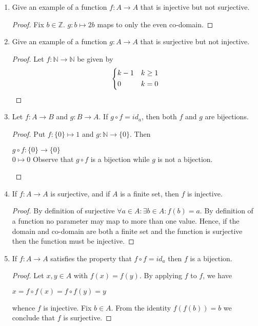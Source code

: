 \documentclass{article}
\begin{document}
\begin{enumerate}
\begin{proof}
    \end{proof}
  \item Give an example of a function $f : A\to A$ that is injective but not surjective.
    \begin{proof}
      Fix $b\in \mathbb{Z}$. $g : b\mapsto 2b$ maps to only the even co-domain.
    \end{proof}
  \item Give an example of a function $g : A\to A$ that is surjective but not injective. 
    \begin{proof}
      Let $f: \mathbb{N} \to \mathbb{N}$ be given by
        $$
        \begin{dcases}
          k-1 & k \geq 1 \\
          0 & k = 0
        \end{dcases}
       $$
     \end{proof}
  \item Let $f : A\to B$ and $g : B\to A$. If $g \circ f = id_{a}$, then both $f$ and $g$ are bijections.
   \begin{proof}
     Put $f : \{0\} \mapsto 1$ and $g: \mathbb{N} \to  \{0\}$. Then
       \begin{center}
         $g \circ f: \{0\} \to \{0\}$ \\
         $0 \mapsto 0$
         Observe that $g \circ f$ is a bijection while $g$ is not a bijection.
       \end{center}
   \end{proof}
  \item If $f : A\to A$ is surjective, and if $A$ is a finite set, then $f$ is injective.
    \begin{proof}
By definition of surjective $\forall a\in A: \exists b\in A: f(b) = a$. By definition of a function no parameter may map to more than one value. Hence, if the domain and co-domain are both a finite set and the function is surjective then the function must be injective.
    \end{proof}
  \item If $f : A\to A$ satisfies the property that $f \circ f = id_{a}$ then $f$ is a bijection.
    \begin{proof}
      Let $x,y\in A$ with $f(x) = f(y)$. By applying $f$ to $f$, we have
      \begin{center}
$x = f \circ f(x) = f \circ f(y) = y$
      \end{center}
whence $f$ is injective. Fix $b\in A$. From the identity $f(f(b)) = b$ we conclude that $f$ is surjective.
    \end{proof}
  \end{enumerate}
\end{document}
